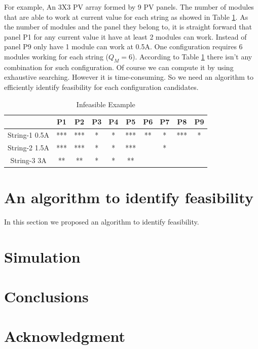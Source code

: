 \documentclass[conference]{IEEEtran}
\begin{document}
For example, An 3X3 PV array formed by 9 PV panels. The number of modules that are able to work at current value for each string as showed in Table \ref{not_feasible}. As the number of modules and the panel they belong to, it is straight forward that panel P1 for any current value it have at least 2 modules can work. Instead of panel P9 only have 1 module can work at 0.5A.
One configuration requires 6 modules working for each string ($Q_M = 6$). According to Table \ref{not_feasible} there isn't any combination for such configuration. Of course we can compute it by using exhaustive searching. However it is time-consuming. So we need an algorithm to efficiently identify feasibility for each configuration candidates.

\begin{table}[htbp]
    \caption{Infeasible Example}
    \begin{center}
    \begin{tabular}{c|c|c|c|c|c|c|c|c|c}
    \hline\hline
             & P1 & P2  & P3  & P4 & P5 & P6  & P7  & P8  & P9  \\ \hline
        String-1 0.5A & ***& *** & *   & *  & ***& **  & *   & *** & * \\ \hline
        String-2 1.5A & ***& *** & *   & *  & ***&     & *   &     &   \\ \hline
        String-3 3A   & ** & **  & *   & *  & ** &     &     &     &   \\\hline \hline
    \end{tabular}
    \label{not_feasible}
    \end{center}
\end{table}
\section{An algorithm to identify feasibility}\label{Sec5}
In this section we proposed an algorithm to identify feasibility.
\subsection{}
\section{Simulation}\label{Sec6}

\section{Conclusions}\label{Sec7}

\section*{Acknowledgment}



\renewcommand\refname{Reference}


\end{document}
